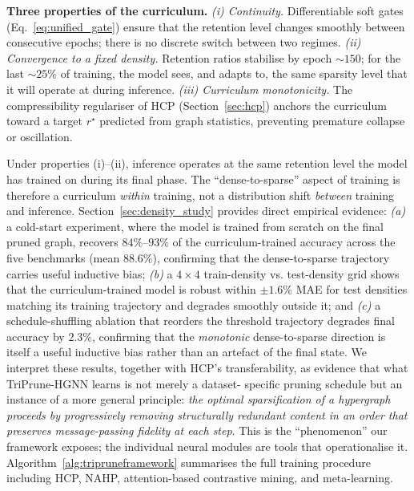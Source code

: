 \documentclass[10pt]{article}
\theoremstyle{plain}
\theoremstyle{definition}
\begin{document}
\textbf{Three properties of the curriculum.} \emph{(i) Continuity.} Differentiable soft gates (Eq.~\eqref{eq:unified_gate}) ensure that the retention level changes smoothly between consecutive epochs; there is no discrete switch between two regimes. \emph{(ii) Convergence to a fixed density.} Retention ratios stabilise by epoch $\sim 150$; for the last $\sim 25\%$ of training, the model sees, and adapts to, the same sparsity level that it will operate at during inference. \emph{(iii) Curriculum monotonicity.} The compressibility regulariser of HCP (Section~\ref{sec:hcp}) anchors the curriculum toward a target $r^\star$ predicted from graph statistics, preventing premature collapse or oscillation.

Under properties (i)--(ii), inference operates at the same retention level the model has trained on during its final phase. The ``dense-to-sparse'' aspect of training is therefore a curriculum \emph{within} training, not a distribution shift \emph{between} training and inference. Section~\ref{sec:density_study} provides direct empirical evidence: \emph{(a)} a cold-start experiment, where the model is trained from scratch on the final pruned graph, recovers $84\%$--$93\%$ of the curriculum-trained accuracy across the five benchmarks (mean $88.6\%$), confirming that the dense-to-sparse trajectory carries useful inductive bias; \emph{(b)} a $4\times 4$ train-density vs. test-density grid shows that the curriculum-trained model is robust within $\pm 1.6\%$ MAE for test densities matching its training trajectory and degrades smoothly outside it; and \emph{(c)} a schedule-shuffling ablation that reorders the threshold trajectory degrades final accuracy by $2.3\%$, confirming that the \emph{monotonic} dense-to-sparse direction is itself a useful inductive bias rather than an artefact of the final state. We interpret these results, together with HCP's transferability, as evidence that what TriPrune-HGNN learns is not merely a dataset- specific pruning schedule but an instance of a more general principle: \emph{the optimal sparsification of a hypergraph proceeds by progressively removing structurally redundant content in an order that preserves message-passing fidelity at each step}. This is the ``phenomenon'' our framework exposes; the individual neural modules are tools that operationalise it. Algorithm~\ref{alg:tripruneframework} summarises the full training procedure including HCP, NAHP, attention-based contrastive mining, and meta-learning.
\end{document}
